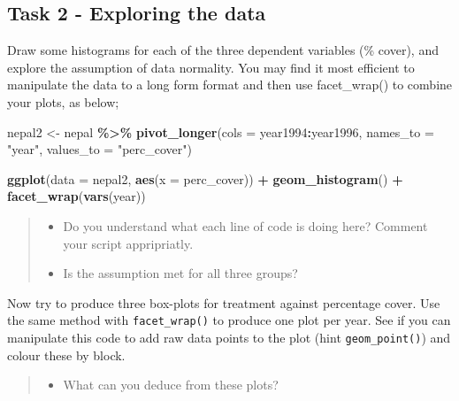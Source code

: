 \documentclass[
]{book}
\newenvironment{Shaded}{\begin{snugshade}}{\end{snugshade}}
\newcommand{\AttributeTok}[1]{\textcolor[rgb]{0.13,0.29,0.53}{#1}}
\newcommand{\FunctionTok}[1]{\textcolor[rgb]{0.13,0.29,0.53}{\textbf{#1}}}
\newcommand{\NormalTok}[1]{#1}
\newcommand{\OtherTok}[1]{\textcolor[rgb]{0.56,0.35,0.01}{#1}}
\newcommand{\SpecialCharTok}[1]{\textcolor[rgb]{0.81,0.36,0.00}{\textbf{#1}}}
\newcommand{\StringTok}[1]{\textcolor[rgb]{0.31,0.60,0.02}{#1}}
\providecommand{\tightlist}{%
  \setlength{\itemsep}{0pt}\setlength{\parskip}{0pt}}
\begin{document}
\hypertarget{task-2---exploring-the-data-1}{%
\subsection{Task 2 - Exploring the data}\label{task-2---exploring-the-data-1}}

Draw some histograms for each of the three dependent variables (\% cover), and explore the assumption of data normality. You may find it most efficient to manipulate the data to a long form format and then use facet\_wrap() to combine your plots, as below;

\begin{Shaded}
\begin{Highlighting}[]
\NormalTok{nepal2 }\OtherTok{\textless{}{-}}\NormalTok{ nepal }\SpecialCharTok{\%\textgreater{}\%}
  \FunctionTok{pivot\_longer}\NormalTok{(}\AttributeTok{cols =}\NormalTok{ year1994}\SpecialCharTok{:}\NormalTok{year1996,}
               \AttributeTok{names\_to =} \StringTok{"year"}\NormalTok{, }
               \AttributeTok{values\_to =} \StringTok{"perc\_cover"}\NormalTok{)}

\FunctionTok{ggplot}\NormalTok{(}\AttributeTok{data =}\NormalTok{ nepal2, }\FunctionTok{aes}\NormalTok{(}\AttributeTok{x =}\NormalTok{ perc\_cover)) }\SpecialCharTok{+}
  \FunctionTok{geom\_histogram}\NormalTok{() }\SpecialCharTok{+}
  \FunctionTok{facet\_wrap}\NormalTok{(}\FunctionTok{vars}\NormalTok{(year))}
\end{Highlighting}
\end{Shaded}

\begin{quote}
\begin{itemize}
\tightlist
\item
  Do you understand what each line of code is doing here? Comment your script appripriatly.
\item
  Is the assumption met for all three groups?
\end{itemize}
\end{quote}

Now try to produce three box-plots for treatment against percentage cover. Use the same method with \texttt{facet\_wrap()} to produce one plot per year. See if you can manipulate this code to add raw data points to the plot (hint \texttt{geom\_point()}) and colour these by block.

\begin{quote}
\begin{itemize}
\tightlist
\item
  What can you deduce from these plots?
\end{itemize}
\end{quote}
\end{document}

